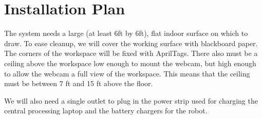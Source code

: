 
\section{Installation Plan}
\label{sec:installation_plan}

The system needs a large (at least 6ft by 6ft), flat indoor surface on which to draw. To ease cleanup, we will cover the working surface with blackboard paper. The corners of the workspace will be fixed with AprilTags. There also must be a ceiling above the workspace low enough to mount the webcam, but high enough to allow the webcam a full view of the workspace. This means that the ceiling must be between 7 ft and 15 ft above the floor. 

We will also need a single outlet to plug in the power strip used for charging the central processing laptop and the battery chargers for the robot. 